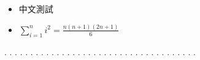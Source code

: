 \begin{itemize}
\item 中文測試 
\item $\sum \limits_{i=1}^n i^2 = \frac{n(n+1)(2n+1)}{6}$
\end{itemize}
.
.
.
.
.
.
.
.
.
.
.
.
.
.
.
.
.
.
.
.
.
.
.
.
.
.
.
.
.
.
.
.
.
.
.
.
.
